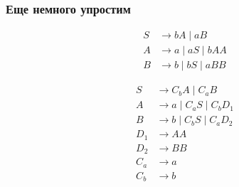 \documentclass{beamer}
\begin{document}
\begin{frame}[fragile]
  \transwipe[direction=90]
  \frametitle{Еще немного упростим}

\begin{align*}
  S &\to bA \mid aB \\
  A &\to a  \mid aS \mid bAA  \\
  B &\to b  \mid bS \mid aBB
\end{align*}

\vfill

\begin{align*}
  S   &\to C_b A \mid C_a B \\
  A   &\to a \mid C_a S \mid C_b D_1 \\
  B   &\to b \mid C_b S \mid C_a D_2 \\
  D_1 &\to A A \\
  D_2 &\to B B \\
  C_a &\to a \\
  C_b &\to b
\end{align*}
\end{frame}
\end{document}
